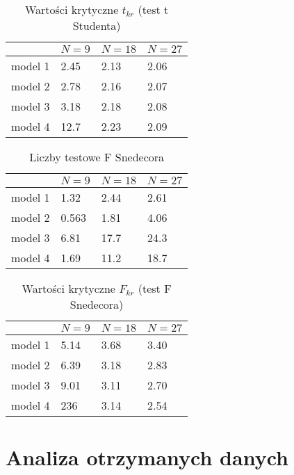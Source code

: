 \documentclass[11pt, a4paper]{article}
\begin{document}
\begin{table}[p!]
	\centering
	\begin{tabularx}{0.7 \textwidth}{b||b|b|b}
		& $N = 9$ & $N = 18$ & $N = 27$ \\[5pt]
		\hline\hline
		model 1 &
			2.45 & 2.13 & 2.06 \\
		model 2 &
			2.78 & 2.16 & 2.07 \\
		model 3 &
			3.18 & 2.18 & 2.08 \\
		model 4 &
			12.7 & 2.23 & 2.09 \\
	\end{tabularx}
	\caption{Wartości krytyczne $t_{kr}$ (test t Studenta)}
	\label{tbl:t_kr}
\end{table}

\clearpage

\newpage

\begin{table}[p!]
	\centering
	\begin{tabularx}{0.7 \textwidth}{b||b|b|b}
		& $N = 9$ & $N = 18$ & $N = 27$ \\[5pt]
		\hline\hline
		model 1 &
			1.32 & 2.44 & 2.61 \\
		model 2 &
			0.563 & 1.81 & 4.06 \\
		model 3 &
			6.81 & 17.7 & 24.3 \\
		model 4 &
			1.69 & 11.2 & 18.7 \\
	\end{tabularx}
	\caption{Liczby testowe F Snedecora}
	\label{tbl:F}
\end{table}

\begin{table}[p!]
	\centering
	\begin{tabularx}{0.7 \textwidth}{b||b|b|b}
		& $N = 9$ & $N = 18$ & $N = 27$ \\[5pt]
		\hline\hline
		model 1 &
			5.14 & 3.68 & 3.40 \\
		model 2 &
			6.39 & 3.18 & 2.83 \\
		model 3 &
			9.01 & 3.11 & 2.70 \\
		model 4 &
			236 & 3.14 & 2.54 \\
	\end{tabularx}
	\caption{Wartości krytyczne $F_{kr}$ (test F Snedecora)}
	\label{tbl:F_kr}
\end{table}

\clearpage

\newpage

\section{Analiza otrzymanych danych}
\end{document}
